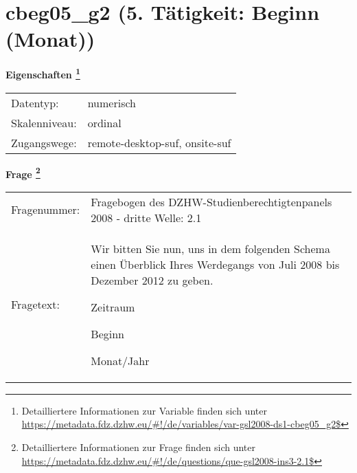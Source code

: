 
    \setcounter{footnote}{0}

    \vspace*{-1.8cm}
	\section{cbeg05\_g2 (5. Tätigkeit: Beginn (Monat))}
	\label{section:cbeg05_g2}



    \vspace*{0.5cm}
    \noindent\textbf{Eigenschaften
	\footnote{Detailliertere Informationen zur Variable finden sich unter
		\url{https://metadata.fdz.dzhw.eu/\#!/de/variables/var-gsl2008-ds1-cbeg05_g2$}}}\\
	\begin{tabularx}{\hsize}{@{}lX}
	Datentyp: & numerisch \\
	Skalenniveau: & ordinal \\
	Zugangswege: &
	  remote-desktop-suf, 
	  onsite-suf
 \\
    \end{tabularx}



				\vspace*{0.5cm}
                \noindent\textbf{Frage
	                \footnote{Detailliertere Informationen zur Frage finden sich unter
		              \url{https://metadata.fdz.dzhw.eu/\#!/de/questions/que-gsl2008-ins3-2.1$}}}\\
				\begin{tabularx}{\hsize}{@{}lX}
					Fragenummer: &
					  Fragebogen des DZHW-Studienberechtigtenpanels 2008 - dritte Welle:
					  2.1
 \\
					Fragetext: & Wir bitten Sie nun, uns in dem folgenden Schema einen Überblick Ihres Werdegangs von Juli 2008 bis Dezember 2012 zu geben.\par  Zeitraum\par  Beginn\par  Monat/Jahr \\
				\end{tabularx}





